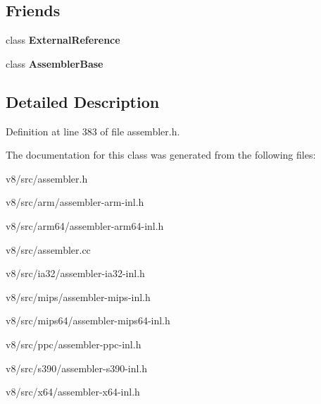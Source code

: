 \subsection*{Friends}
\begin{DoxyCompactItemize}
\item 
\mbox{\label{classv8_1_1internal_1_1CpuFeatures_a6cad52a007e84a78f169131b667e2d49}} 
class {\bfseries External\+Reference}
\item 
\mbox{\label{classv8_1_1internal_1_1CpuFeatures_a528f19176d1524b91b7f48bcbdc2bc9c}} 
class {\bfseries Assembler\+Base}
\end{DoxyCompactItemize}


\subsection{Detailed Description}


Definition at line 383 of file assembler.\+h.



The documentation for this class was generated from the following files\+:\begin{DoxyCompactItemize}
\item 
v8/src/assembler.\+h\item 
v8/src/arm/assembler-\/arm-\/inl.\+h\item 
v8/src/arm64/assembler-\/arm64-\/inl.\+h\item 
v8/src/assembler.\+cc\item 
v8/src/ia32/assembler-\/ia32-\/inl.\+h\item 
v8/src/mips/assembler-\/mips-\/inl.\+h\item 
v8/src/mips64/assembler-\/mips64-\/inl.\+h\item 
v8/src/ppc/assembler-\/ppc-\/inl.\+h\item 
v8/src/s390/assembler-\/s390-\/inl.\+h\item 
v8/src/x64/assembler-\/x64-\/inl.\+h\end{DoxyCompactItemize}
